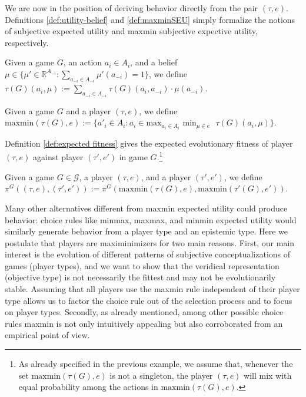\documentclass[fleqn,reqno,11pt]{article}
\begin{document}
We are now in the position of deriving behavior directly from the pair $(\tau, e)$. Definitions \ref{def:utility-belief} and \ref{def:maxminSEU} simply formalize the notions of subjective expected utility and maxmin subjective expective utility, respectively. 

\begin{definition} \label{def:utility-belief}

Given a game $G$, an action $a_i \in A_i$, and a belief $\mu \in \lbrace \mu' \in \mathbb{R}^{A_{-i}}: \sum_{a_{-i} \in A_{-i}} \mu'(a_{-i}) = 1 \rbrace$, we define $\tau(G)(a_i, \mu):= \sum_{a_{-i} \in A_{-i}} \tau(G)(a_i, a_{-i}) \cdot \mu(a_{-i})$. 

\end{definition}

\begin{definition} \label{def:maxminSEU}

Given a game $G$ and a player $(\tau, e)$, we define $\text{maxmin}(\tau(G), e):= \lbrace a'_i \in A_i : a_i \in \text{max}_{a_i \in A_i} \text{ min}_{\mu \in e} \text{ } \tau(G)(a_i, \mu) \rbrace$.

\end{definition}

\noindent Definition \ref{def:expected fitness} gives the expected evolutionary fitness of player $(\tau, e)$ against player $(\tau', e')$ in game $G$.\footnote{As already specified in the previous example, we assume that, whenever the set $\text{maxmin}(\tau(G), e)$ is not a singleton, the player $(\tau, e)$ will mix with equal probability among the actions in $\text{maxmin}(\tau(G), e)$.}

\begin{definition} \label{def:expected fitness}

Given a game $G \in \mathcal{G}$, a player $(\tau, e)$, and a player $(\tau', e')$, we define $\pi^G((\tau, e),(\tau', e')):= \pi^G(\text{maxmin}(\tau(G), e),\text{maxmin}(\tau'(G), e'))$. 

\end{definition}


Many other alternatives different from maxmin expected utility could produce behavior: choice rules like minmax, maxmax, and minmin expected utility would similarly generate behavior from a player type and an epistemic type. Here we postulate that players are maximinimizers for two main reasons. First, our main interest is the evolution of different patterns of subjective conceptualizations of games (player types), and we want to show that the veridical representation (objective type) is not necessarily the fittest and may not be evolutionarily stable. Assuming that all players use the maxmin rule independent of their player type allows us to factor the choice rule out of the selection process and to focus on player types. Secondly, as already mentioned, among other possible choice rules maxmin is not only intuitively appealing but also corroborated from an empirical point of view.
\end{document}
